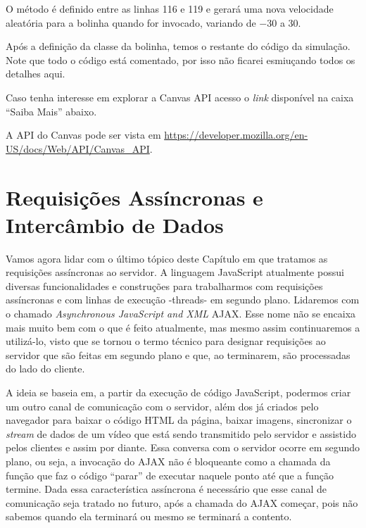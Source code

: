 O método  é definido entre as linhas 116 e 119 e gerará uma nova velocidade aleatória para a bolinha quando for invocado, variando de $-30$ a $30$.

Após a definição da classe da bolinha, temos o restante do código da simulação. Note que todo o código está comentado, por isso não ficarei esmiuçando todos os detalhes aqui.

Caso tenha interesse em explorar a Canvas API acesso o \textit{link} disponível na caixa ``Saiba Mais'' abaixo.

\begin{saibaMais}
    A API do Canvas pode ser vista em \url{https://developer.mozilla.org/en-US/docs/Web/API/Canvas_API}.
\end{saibaMais}



\section{Requisições Assíncronas e Intercâmbio de Dados}

Vamos agora lidar com o último tópico deste Capítulo em que tratamos as requisições assíncronas ao servidor. A linguagem JavaScript atualmente possui diversas funcionalidades e construções para trabalharmos com requisições assíncronas e com linhas de execução -threads- em segundo plano. Lidaremos com o chamado \textit{Asynchronous JavaScript and XML} AJAX. Esse nome não se encaixa mais muito bem com o que é feito atualmente, mas mesmo assim continuaremos a utilizá-lo, visto que se tornou o termo técnico para designar requisições ao servidor que são feitas em segundo plano e que, ao terminarem, são processadas do lado do cliente.

A ideia se baseia em, a partir da execução de código JavaScript, podermos criar um outro canal de comunicação com o servidor, além dos já criados pelo navegador para baixar o código HTML da página, baixar imagens, sincronizar o \textit{stream} de dados de um vídeo que está sendo transmitido pelo servidor e assistido pelos clientes e assim por diante. Essa conversa com o servidor ocorre em segundo plano, ou seja, a invocação do AJAX não é bloqueante como a chamada da função  que faz o código ``parar'' de executar naquele ponto até que a função termine. Dada essa característica assíncrona é necessário que esse canal de comunicação seja tratado no futuro, após a chamada do AJAX começar, pois não sabemos quando ela terminará ou mesmo se terminará a contento.

